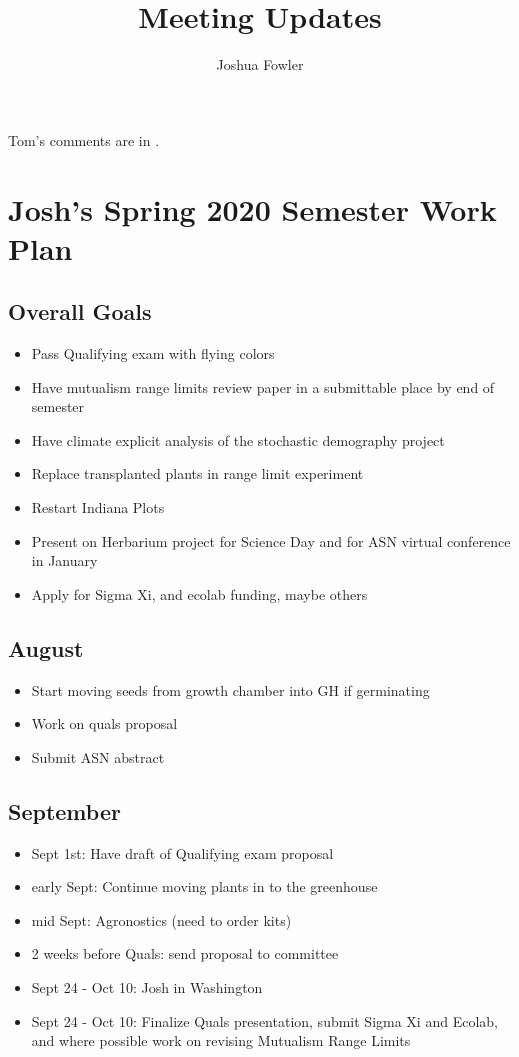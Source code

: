 \documentclass{article}
\title{Meeting Updates}
\author{Joshua Fowler}
\newcommand{\tom}[1]{{\textit{\color{WildStrawberry}{[#1]}}}}
\begin{document}
%
  \maketitle
  Tom's comments are in \tom{WildStrawberry}.

\section*{Josh's Spring 2020 Semester Work Plan}
\subsection*{Overall Goals}
\begin{itemize}
\item{Pass Qualifying exam with flying colors}
\item{Have mutualism range limits review paper in a submittable place by end of semester}
\item{Have climate explicit analysis of the stochastic demography project}
\item{Replace transplanted plants in range limit experiment}
\item{Restart Indiana Plots}
\item{Present on Herbarium project for Science Day and for ASN virtual conference in January}
\item{Apply for Sigma Xi, and ecolab funding, maybe others}
\end{itemize}

\subsection*{August}
\begin{itemize}
\item{Start moving seeds from growth chamber into GH if germinating}
\item{Work on quals proposal}
\item{Submit ASN abstract}
\end{itemize}
\subsection*{September}
\begin{itemize}
\item{Sept 1st: Have draft of Qualifying exam proposal}
\item{early Sept: Continue moving plants in to the greenhouse}
\item{mid Sept: Agronostics (need to order kits)}
\item{2 weeks before Quals: send proposal to committee}
\item{Sept 24 - Oct 10: Josh in Washington}
\item{Sept 24 - Oct 10: Finalize Quals presentation, submit Sigma Xi and Ecolab, and where possible work on revising Mutualism Range Limits}
\end{itemize}
\end{document}
